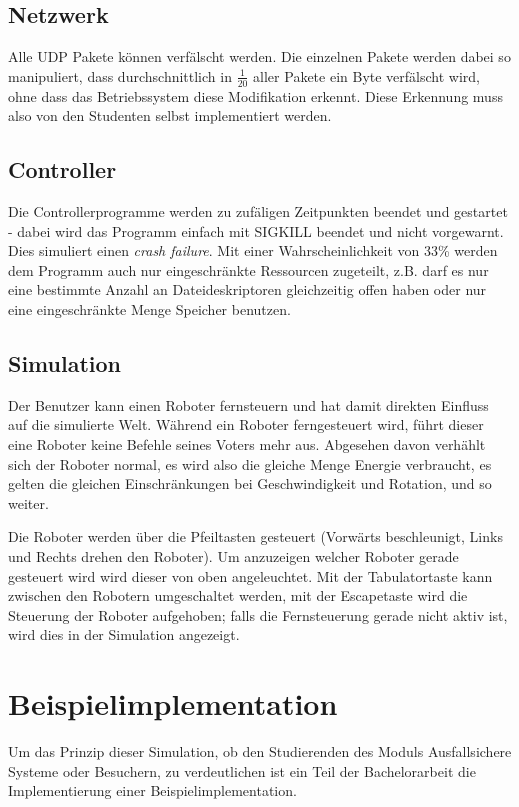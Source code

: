 \documentclass[
    12pt,
    bibliography=totoc,
    ngerman,
	enabledeprecatedfontcommands
]{scrartcl}
\begin{document}

\subsection{Netzwerk}
Alle UDP Pakete k{\"{o}}nnen verf{\"{a}}lscht werden. Die einzelnen Pakete werden dabei so manipuliert, dass durchschnittlich in $ \frac{1}{20} $ aller Pakete
ein Byte verf{\"{a}}lscht wird, ohne dass das Betriebssystem diese Modifikation erkennt. Diese Erkennung muss also von den Studenten selbst implementiert werden.

\subsection{Controller}
Die Controllerprogramme werden zu zuf{\"{a}}ligen Zeitpunkten beendet und gestartet - dabei wird das Programm einfach mit SIGKILL beendet und nicht vorgewarnt. Dies simuliert einen \textit{crash failure}. Mit einer Wahrscheinlichkeit von 33\% werden dem Programm auch nur eingeschr{\"{a}}nkte Ressourcen zugeteilt, z.B. darf es nur eine bestimmte Anzahl an Dateideskriptoren gleichzeitig
offen haben oder nur eine eingeschr{\"{a}}nkte Menge Speicher benutzen.


\subsection{Simulation}
Der Benutzer kann einen Roboter fernsteuern und hat damit direkten Einfluss auf die simulierte Welt. W{\"{a}}hrend ein Roboter
ferngesteuert wird, f{\"{u}}hrt dieser eine Roboter keine Befehle seines Voters mehr aus. Abgesehen davon verh{\"{a}}hlt sich der Roboter normal, es wird also die gleiche Menge Energie verbraucht, es gelten die gleichen Einschr{\"{a}}nkungen bei
Geschwindigkeit und Rotation, und so weiter.

Die Roboter werden {\"{u}}ber die Pfeiltasten gesteuert (Vorw{\"{a}}rts beschleunigt, Links und Rechts drehen den Roboter). Um
anzuzeigen welcher Roboter gerade gesteuert wird wird dieser von oben angeleuchtet. Mit der Tabulatortaste kann zwischen den
Robotern umgeschaltet werden, mit der Escapetaste wird die Steuerung der Roboter aufgehoben; falls die Fernsteuerung gerade nicht aktiv ist, wird dies in der Simulation angezeigt.

\clearpage
\section{Beispielimplementation}
Um das Prinzip dieser Simulation, ob den Studierenden des Moduls Ausfallsichere Systeme oder Besuchern, zu verdeutlichen ist ein Teil der Bachelorarbeit die Implementierung einer
Beispielimplementation.
\end{document}
